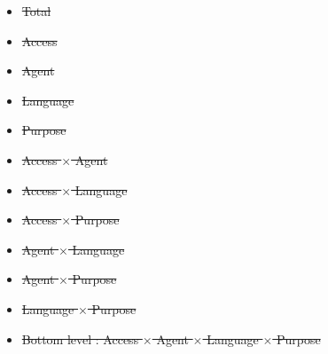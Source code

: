 \documentclass[11pt,a4paper,]{article}
\providecommand{\tightlist}{%
  \setlength{\itemsep}{0pt}\setlength{\parskip}{0pt}}
\providecommand{\DIFdeltex}[1]{{\protect\color{red}\sout{#1}}}                      %
\providecommand{\DIFdelbegin}{} %
\providecommand{\DIFdel}[1]{\texorpdfstring{\DIFdeltex{#1}}{}} %
\newcommand{\DIFscaledelfig}{0.5}
\newlength{\DIFdelgraphicswidth} %
\newlength{\DIFdelgraphicsheight} %
\newcommand{\DIFdelincludegraphics}[2][]{%
\sbox{\DIFdelgraphicsbox}{\DIFOincludegraphics[#1]{#2}}%
\settoboxwidth{\DIFdelgraphicswidth}{\DIFdelgraphicsbox} %
\settoboxtotalheight{\DIFdelgraphicsheight}{\DIFdelgraphicsbox} %
\scalebox{\DIFscaledelfig}{%
\parbox[b]{\DIFdelgraphicswidth}{\usebox{\DIFdelgraphicsbox}\\[-\baselineskip] \rule{\DIFdelgraphicswidth}{0em}}\llap{\resizebox{\DIFdelgraphicswidth}{\DIFdelgraphicsheight}{%
\setlength{\unitlength}{\DIFdelgraphicswidth}%
\begin{picture}(1,1)%
\thicklines\linethickness{2pt} %
{\color[rgb]{1,0,0}\put(0,0){\framebox(1,1){}}}%
{\color[rgb]{1,0,0}\put(0,0){\line( 1,1){1}}}%
{\color[rgb]{1,0,0}\put(0,1){\line(1,-1){1}}}%
\end{picture}%
}\hspace*{3pt}}} %
} %
\DeclareRobustCommand{\DIFdelbegin}{\DIFOdelbegin \let\includegraphics\DIFdelincludegraphics} %
\begin{document}
\DIFdelbegin %
\begin{itemize}%
\item%
\DIFdel{Total }%
\item%
\DIFdel{Access }%
\item%
\DIFdel{Agent }%
\item%
\DIFdel{Language }%
\item%
\DIFdel{Purpose }%
\item%
\DIFdel{Access \(\times\) Agent }%
\item%
\DIFdel{Access \(\times\) Language }%
\item%
\DIFdel{Access \(\times\) Purpose }%
\item%
\DIFdel{Agent \(\times\) Language }%
\item%
\DIFdel{Agent \(\times\) Purpose }%
\item%
\DIFdel{Language \(\times\) Purpose }%
\item%
\DIFdel{Bottom level : Access \(\times\) Agent \(\times\) Language \(\times\) Purpose
}
\end{itemize}%
\end{document}
